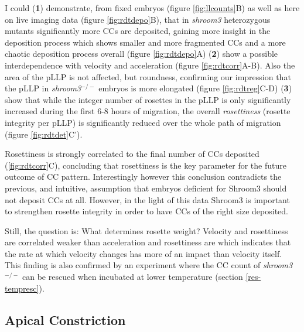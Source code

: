 \documentclass[11pt,singlespacinge,twoside]{reedthesis} %
\theoremstyle{definition}
\theoremstyle{definition}
\theoremstyle{definition}
\theoremstyle{remark}
\begin{document}
I could (\textbf{1}) demonstrate, from fixed embryos (figure \ref{fig:llcounts}B) as well as here on live imaging data (figure \ref{fig:rdtdepo}B), that in \emph{shroom3} heterozygous mutants significantly more CCs are deposited, gaining more insight in the deposition process which shows smaller and more fragmented CCs and a more chaotic deposition process overall (figure \ref{fig:rdtdepo}A) (\textbf{2}) show a possible interdependence with velocity and acceleration (figure \ref{fig:rdtcorr}A-B). Also the area of the pLLP is not affected, but roundness, confirming our impression that the pLLP in \emph{shroom3}\(^{-/-}\) embryos is more elongated (figure \ref{fig:rdtreg}C-D) (\textbf{3}) show that while the integer number of rosettes in the pLLP is only significantly increased during the first 6-8 hours of migration, the overall \emph{rosettiness} (rosette integrity per pLLP) is significantly reduced over the whole path of migration (figure \ref{fig:rdtdet}C').

Rosettiness is strongly correlated to the final number of CCs deposited (\ref{fig:rdtcorr}C), concluding that rosettiness is the key parameter for the future outcome of CC pattern. Interestingly however this conclusion contradicts the previous, and intuitive, assumption that embryos deficient for Shroom3 should not deposit CCs at all. However, in the light of this data Shroom3 is important to strengthen rosette integrity in order to have CCs of the right size deposited.

Still, the question is: What determines rosette weight? Velocity and rosettiness are correlated weaker than acceleration and rosettiness are which indicates that the rate at which velocity changes has more of an impact than velocity itself. This finding is also confirmed by an experiment where the CC count of \emph{shroom3}\(^{-/-}\) can be rescued when incubated at lower temperature (section \ref{res-tempresc}).

\hypertarget{apical-constriction-3}{%
\subsection{Apical Constriction}\label{apical-constriction-3}}
\end{document}
